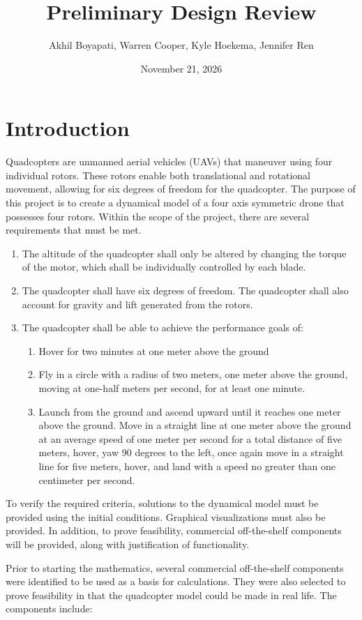\documentclass[11pt]{article}
\title{Preliminary Design Review}
\author{Akhil Boyapati, Warren Cooper, Kyle Hoekema, Jennifer Ren}
\date{November 21, 2026}
\begin{document}
\maketitle

\section{Introduction}
Quadcopters are unmanned aerial vehicles (UAVs) that maneuver using four individual rotors. These rotors enable both translational and rotational movement, allowing for six degrees of freedom for the quadcopter. The purpose of this project is to create a dynamical model of a four axis symmetric drone that possesses four rotors. Within the scope of the project, there are several requirements that must be met.

\begin{enumerate}
\item The altitude of the quadcopter shall only be altered by changing the torque of the motor, which shall be individually controlled by each blade.
\item The quadcopter shall have six degrees of freedom. The quadcopter shall also account for gravity and lift generated from the rotors.
\item The quadcopter shall be able to achieve the performance goals of:
\begin{enumerate} 
\item Hover for two minutes at one meter above the ground
\item Fly in a circle with a radius of two meters, one meter above the ground, moving at one-half meters per second, for at least one minute.
\item Launch from the ground and ascend upward until it reaches one meter above the ground. Move in a straight line at one meter above the ground at an average speed of one meter per second for a total distance of five meters, hover, yaw 90 degrees to the left, once again move in a straight line for five meters, hover, and land with a speed no greater than one centimeter per second.
\end{enumerate}
\end{enumerate}

To verify the required criteria, solutions to the dynamical model must be provided using the initial conditions. Graphical visualizations must also be provided. In addition, to prove feasibility, commercial off-the-shelf components will be provided, along with justification of functionality.
\par
\vspace{0.1in}
Prior to starting the mathematics, several commercial off-the-shelf components were identified to be used as a basis for calculations. They were also selected to prove feasibility in that the quadcopter model could be made in real life.  The components include: 
\end{document}
